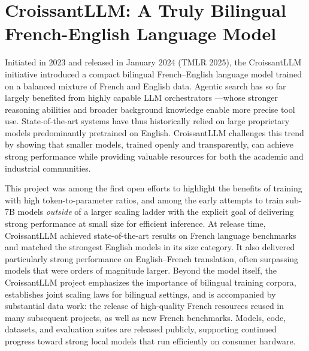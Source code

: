 \setchapterpreamble[u]{\margintoc}
\chapter{CroissantLLM: A Truly Bilingual French-English Language Model}
\label{ch:croissant}


\begin{sagekaobox}[frametitle=Paper Context]
    Initiated in 2023 and released in January 2024 (TMLR 2025), the CroissantLLM initiative \cite{faysse_croissantllm_2024} introduced a compact bilingual French--English language model trained on a balanced mixture of French and English data. Agentic search has so far largely benefited from highly capable LLM orchestrators —whose stronger reasoning abilities and broader background knowledge enable more precise tool use. State-of-the-art systems have thus historically relied on large proprietary models predominantly pretrained on English. CroissantLLM challenges this trend by showing that smaller models, trained openly and transparently, can achieve strong performance while providing valuable resources for both the academic and industrial communities.
    
    This project was among the first open efforts to highlight the benefits of training with high token-to-parameter ratios, and among the early attempts to train sub-7B models \emph{outside} of a larger scaling ladder with the explicit goal of delivering strong performance at small size for efficient inference. At release time, CroissantLLM achieved state-of-the-art results on French language benchmarks and matched the strongest English models in its size category. It also delivered particularly strong performance on English--French translation, often surpassing models that were orders of magnitude larger. Beyond the model itself, the CroissantLLM project emphasizes the importance of bilingual training corpora, establishes joint scaling laws for bilingual settings, and is accompanied by substantial data work: the release of high-quality French resources reused in many subsequent projects, as well as new French benchmarks. Models, code, datasets, and evaluation suites are released publicly, supporting continued progress toward strong local models that run efficiently on consumer hardware.


\end{sagekaobox}
